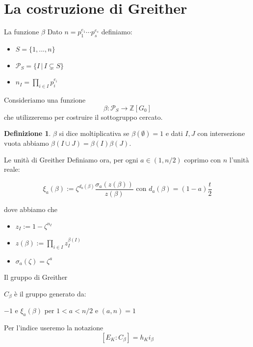 \documentclass{beamer}
\theoremstyle{plain}
\theoremstyle{remark}
\theoremstyle{definition}
\newtheorem{deff}[teo]{Definizione}
\newcommand{\PS}{\mathcal{P}_S}
\newcommand{\Z}{\mathbb{Z}}
\begin{document}
	\section{La costruzione di Greither}
	
	\begin{frame}[fragile]{La funzione $\beta$}
		Dato $ n= p_1 ^{e_1} \cdots p_s ^{e_s} $ definiamo: 
		\begin{itemize}
			\item $ S = \{1, ... , n \}$
			\item $ \PS = \{ I \,|\, I \subsetneq S\}$ 
			\item $ n_I = \prod_{i \in I} p_i ^{e_i} $ 
		\end{itemize} \pause
		Consideriamo una funzione $$ \beta : \PS \to \Z[G_0] $$ che utilizzeremo per costruire il sottogruppo cercato. \pause 
		\begin{deff}
			$\beta$ si dice moltiplicativa se $ \beta (\emptyset) = 1 $ e dati $ I,J $ con intersezione vuota abbiamo $ \beta (I\cup J) = \beta(I) \beta(J)$.
		\end{deff}
	\end{frame}

	\begin{frame}{Le unità di Greither}
		Definiamo ora, per ogni $ a \in (1 , n/2)$ coprimo con $ n $ l'unità reale:
			\begin{exampleblock}{}
			\[
				\xi_a (\beta) := \zeta ^{d_a (\beta)} \frac{\sigma_a (z(\beta))}{z(\beta)} \text{ con } d_a(\beta)= (1-a)\frac{t}{2}
			\]
			\end{exampleblock}
			dove abbiamo che
			\begin{itemize}
				\item $ z_I  := 1 - \zeta ^{n_I}$
				\item $ z(\beta ):= \prod_{i\in I} z_I ^{\beta(I)} $
				\item $ \sigma_a(\zeta)= \zeta ^a $
			\end{itemize}
	\end{frame}	
	
	\begin{frame}{Il gruppo di Greither}
		\begin{alertblock}{}
		 		$C_\beta $ è il gruppo generato da:
		 		\begin{center}
		 		
		 		 $ {-1} $ e $ \xi_a (\beta) $ per $ 1< a< n/2 $ e $ (a,n)=1 $
		 		\end{center}
	 	\end{alertblock}
	 	\pause
	 	Per l'indice useremo la notazione $$ [E_K : C_\beta] = h_K i_\beta $$
	\end{frame}
	
\end{document}
